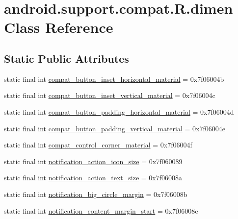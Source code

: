 \hypertarget{classandroid_1_1support_1_1compat_1_1_r_1_1dimen}{}\section{android.\+support.\+compat.\+R.\+dimen Class Reference}
\label{classandroid_1_1support_1_1compat_1_1_r_1_1dimen}
\subsection*{Static Public Attributes}
\begin{DoxyCompactItemize}
\item 
static final int \mbox{\hyperlink{classandroid_1_1support_1_1compat_1_1_r_1_1dimen_a33e6491b341d517a375ea9c0f0fc52b5}{compat\+\_\+button\+\_\+inset\+\_\+horizontal\+\_\+material}} = 0x7f06004b
\item 
static final int \mbox{\hyperlink{classandroid_1_1support_1_1compat_1_1_r_1_1dimen_a6975ac1dada1db38a8352cf9b8d92583}{compat\+\_\+button\+\_\+inset\+\_\+vertical\+\_\+material}} = 0x7f06004c
\item 
static final int \mbox{\hyperlink{classandroid_1_1support_1_1compat_1_1_r_1_1dimen_a603e1a2062ab6d24601f6736f8e28da0}{compat\+\_\+button\+\_\+padding\+\_\+horizontal\+\_\+material}} = 0x7f06004d
\item 
static final int \mbox{\hyperlink{classandroid_1_1support_1_1compat_1_1_r_1_1dimen_a32b444450ecc285cf14a41708b7b6130}{compat\+\_\+button\+\_\+padding\+\_\+vertical\+\_\+material}} = 0x7f06004e
\item 
static final int \mbox{\hyperlink{classandroid_1_1support_1_1compat_1_1_r_1_1dimen_abb3c997f1c28c56a9d2a9772fe316dea}{compat\+\_\+control\+\_\+corner\+\_\+material}} = 0x7f06004f
\item 
static final int \mbox{\hyperlink{classandroid_1_1support_1_1compat_1_1_r_1_1dimen_a70b7aeaab5146075665eb2ffc821ed8f}{notification\+\_\+action\+\_\+icon\+\_\+size}} = 0x7f060089
\item 
static final int \mbox{\hyperlink{classandroid_1_1support_1_1compat_1_1_r_1_1dimen_a62cb588e7929184344c9b70c35e5c8f3}{notification\+\_\+action\+\_\+text\+\_\+size}} = 0x7f06008a
\item 
static final int \mbox{\hyperlink{classandroid_1_1support_1_1compat_1_1_r_1_1dimen_ad5143045de575d03994fd52f70061270}{notification\+\_\+big\+\_\+circle\+\_\+margin}} = 0x7f06008b
\item 
static final int \mbox{\hyperlink{classandroid_1_1support_1_1compat_1_1_r_1_1dimen_a87055ffdc6b8120cc5fc23f2b170e1b2}{notification\+\_\+content\+\_\+margin\+\_\+start}} = 0x7f06008c

\end{DoxyCompactItemize}
